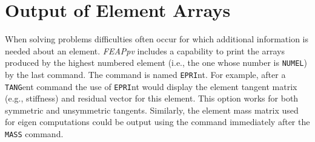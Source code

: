 \section{Output of Element Arrays}
\label{eouts}

When solving problems difficulties often occur for which additional information
is needed about an element.  {\sl FEAPpv} includes a capability to print the
arrays produced by the highest numbered element (i.e., the one whose number
is {\tt NUMEL}) by the last command.  The command is named {\tt EPRI}nt.
For example, after a {\tt TANG}ent command the use of {\tt EPRI}nt
would display the element tangent matrix (e.g., stiffness) and residual
vector for this element.  This option works for both symmetric and unsymmetric
tangents.  Similarly, the element mass matrix used for eigen computations
could be output using the command immediately after the {\tt MASS} command.
